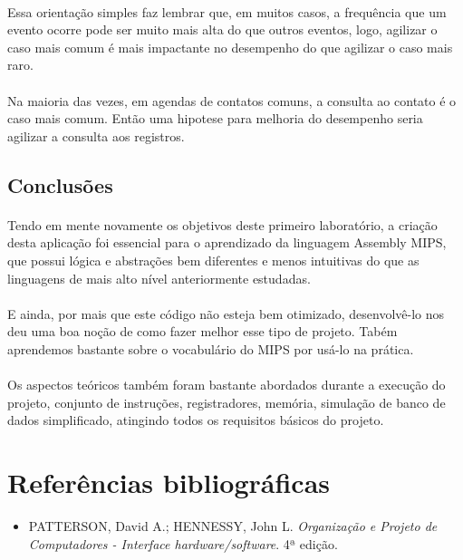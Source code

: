 \documentclass[12pt]{article}
\begin{document}
    \paragraph{}
    Essa orientação simples faz lembrar que, em muitos casos, a frequência que um evento ocorre  pode ser muito mais alta do que outros eventos, logo, agilizar o caso mais comum é mais impactante no desempenho do que agilizar o caso mais raro.
    \paragraph{}
    Na maioria das vezes, em agendas de contatos comuns,  a consulta ao contato é o caso mais comum. Então uma hipotese para melhoria do desempenho seria agilizar a consulta aos registros. 
\subsection{Conclusões}
    \paragraph{}
    Tendo em mente novamente os objetivos deste primeiro laboratório, a criação desta aplicação foi essencial para o aprendizado da linguagem Assembly MIPS, que possui lógica e abstrações bem diferentes e menos intuitivas do que as linguagens de mais alto nível anteriormente estudadas.
    \paragraph{}
    E ainda, por mais que este código não esteja bem otimizado, desenvolvê-lo nos deu uma boa noção de como fazer melhor esse tipo de projeto. Tabém aprendemos bastante sobre o vocabulário do MIPS por usá-lo na prática.
    \paragraph{}
    Os aspectos teóricos também foram bastante abordados durante a execução do projeto, conjunto de instruções, registradores, memória, simulação de banco de dados simplificado, atingindo todos os requisitos básicos do projeto.

\section{Referências bibliográficas}
\begin{itemize}
\item PATTERSON, David A.; HENNESSY, John L. \textit{Organização e Projeto de Computadores - Interface hardware/software}. 4ª edição.
\end{itemize}
\end{document}
